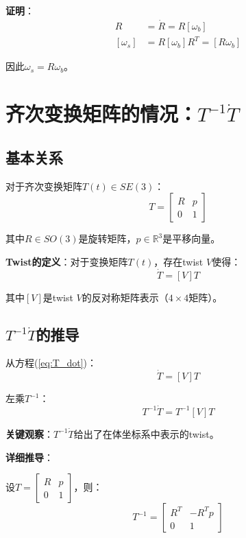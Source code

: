 \documentclass[12pt,a4paper]{article}
\begin{document}
\textbf{证明}：
\begin{align}
[\omega_s] R &= \dot{R} = R [\omega_b] \\
[\omega_s] &= R [\omega_b] R^T = [R \omega_b]
\end{align}

因此$\omega_s = R \omega_b$。

\section{齐次变换矩阵的情况：$T^{-1}\dot{T}$}

\subsection{基本关系}

对于齐次变换矩阵$T(t) \in SE(3)$：
\begin{equation}
T = \begin{bmatrix} R & p \\ 0 & 1 \end{bmatrix}
\end{equation}

其中$R \in SO(3)$是旋转矩阵，$p \in \mathbb{R}^3$是平移向量。

\textbf{Twist的定义}：对于变换矩阵$T(t)$，存在twist $V$使得：
\begin{equation}
\dot{T} = [V] T
\label{eq:T_dot}
\end{equation}

其中$[V]$是twist $V$的反对称矩阵表示（$4 \times 4$矩阵）。

\subsection{$T^{-1}\dot{T}$的推导}

从方程(\ref{eq:T_dot})：
\begin{equation}
\dot{T} = [V] T
\end{equation}

左乘$T^{-1}$：
\begin{equation}
T^{-1} \dot{T} = T^{-1} [V] T
\end{equation}

\textbf{关键观察}：$T^{-1} \dot{T}$给出了在体坐标系中表示的twist。

\textbf{详细推导}：

设$T = \begin{bmatrix} R & p \\ 0 & 1 \end{bmatrix}$，则：
\begin{equation}
T^{-1} = \begin{bmatrix} R^T & -R^T p \\ 0 & 1 \end{bmatrix}
\end{equation}
\end{document}
